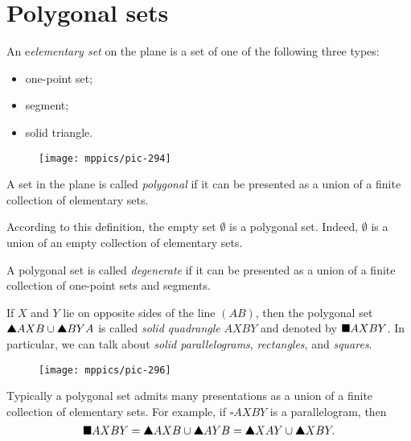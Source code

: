 \section{Polygonal sets}

An e\emph{elementary set} on the plane 
is a set of one of the following three types:
\begin{itemize}
 \item one-point set;
 \item segment;
 \item solid triangle.
\end{itemize}

\begin{wrapfigure}{r}{24 mm}
\vskip-12mm
\centering
\texttt{[image: mppics/pic-294]}
\end{wrapfigure}

A set in the plane is called \emph{polygonal} if it can be presented as a union of a finite collection of elementary sets.

According to this definition, the empty set $\emptyset$
is a polygonal set.
Indeed, $\emptyset$ is a union of an empty collection of elementary sets.

A polygonal set is called \emph{degenerate} if it can be presented as a union of a finite collection of one-point sets and segments.

If $X$ and $Y$ lie on opposite sides of the line $(AB)$,
then the polygonal set
$\solidtriangle AXB\cup \solidtriangle BYA$
is called \emph{solid quadrangle} $AXBY$ and denoted by 
$\blacksquare AXBY$.
In particular, 
we can talk about \emph{solid parallelograms}, \emph{rectangles}, and \emph{squares}.

\begin{wrapfigure}{o}{38 mm}
\centering
\texttt{[image: mppics/pic-296]}
\end{wrapfigure}

Typically a polygonal set admits many 
presentations as a union of a finite collection of elementary sets.
For example, if $\square AXBY$ is a parallelogram, then
\[\solidsquare AXBY=\solidtriangle AXB\cup \solidtriangle AYB=\solidtriangle XAY\cup \solidtriangle XBY.\]

